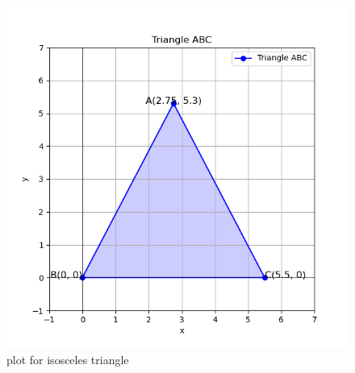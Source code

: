 \documentclass[journal]{IEEEtran}
\begin{document}
\begin{figure}[h!]
\centering
\includegraphics[width=0.7\columnwidth]{figs/Figure_1.png}
\caption{plot for isosceles triangle}
 \label{fig. 3-3-9-1}
\end{figure}
\end{document}
